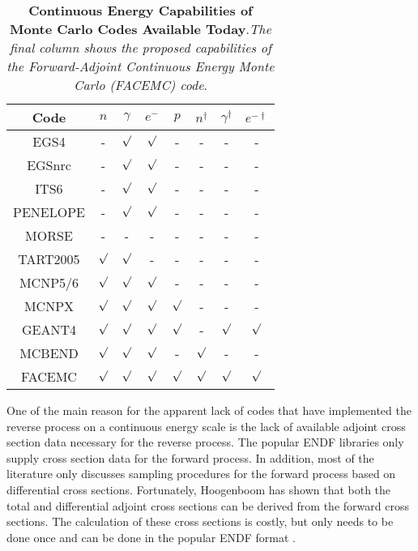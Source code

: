 \documentclass[letterpaper,12pt]{article}
\begin{document}
\begin{table}[ht]
\label{table:monte_carlo_codes_today}
  \caption{\textbf{Continuous Energy Capabilities of Monte Carlo Codes Available
      Today}.\textit{The final column shows the proposed capabilities of the 
      Forward-Adjoint Continuous Energy Monte Carlo (FACEMC) code}.}
  \centering
  \begin{tabular}{c c c c c c c c }
    \hline\hline
    Code & $n$ & $\gamma$ & $e^-$ & $p$ & $n^{\dagger}$ & $\gamma^{\dagger}$ & $e^{-\dagger}$ \\ [0.5ex]
    \hline
    EGS4 & - & $\surd$ & $\surd$ & - & - & - & -  \\
    EGSnrc & - & $\surd$ & $\surd$ & - & - & - & - \\
    ITS6 & - & $\surd$ & $\surd$ & - & - & - & - \\
    PENELOPE & - & $\surd$ & $\surd$ & - & - & - & - \\
    MORSE & - & - & - & - & - & - & - \\
    TART2005 & $\surd$ & $\surd$ & - & - & - & - & - \\
    MCNP5/6 & $\surd$ & $\surd$ & $\surd$ & - & - & - & - \\
    MCNPX & $\surd$ & $\surd$ & $\surd$ & $\surd$ & - & - & - \\
    GEANT4 & $\surd$ & $\surd$ & $\surd$ & $\surd$ & - & $\surd$ & $\surd$ \\
    MCBEND & $\surd$ & $\surd$ & $\surd$ & - & $\surd$ & - & - \\ [1ex]
    \hline
    FACEMC & $\surd$ & $\surd$ & $\surd$ & $\surd$ & $\surd$ & $\surd$ & $\surd$ \\ [1ex]
    \hline
  \end{tabular}
  \label{table:mccodes}
\end{table}

One of the main reason for the apparent lack of codes that have implemented 
the reverse process on a continuous energy scale is
the lack of available adjoint cross section data necessary for the reverse 
process. The popular ENDF libraries only supply cross section data for the 
forward process. In addition, most of the literature only discusses sampling 
procedures for the forward process based on differential cross sections. 
Fortunately, Hoogenboom has shown that both the total and 
differential adjoint cross sections can be derived from the forward cross 
sections. The calculation of these cross sections is costly, but only needs to 
be done once and can be done in the popular ENDF format
\cite{hoogenboom_adjoint_1977}. 
\end{document}
